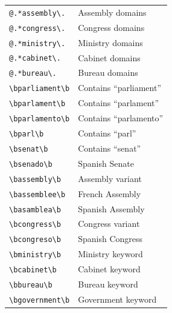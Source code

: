 \documentclass[12pt, letterpaper]{article}
\begin{document}
\begin{table}[ht]
\begin{tabular}{@{\hspace{0\tabcolsep}}ll@{\hspace{0\tabcolsep}}}
\verb|@.*assembly\.| & Assembly domains \\
\verb|@.*congress\.| & Congress domains \\
\verb|@.*ministry\.| & Ministry domains \\
\verb|@.*cabinet\.| & Cabinet domains \\
\verb|@.*bureau\.| & Bureau domains \\
\verb|\bparliament\b| & Contains ``parliament'' \\
\verb|\bparlament\b| & Contains ``parlament'' \\
\verb|\bparlamento\b| & Contains ``parlamento'' \\
\verb|\bparl\b| & Contains ``parl'' \\
\verb|\bsenat\b| & Contains ``senat'' \\
\verb|\bsenado\b| & Spanish Senate \\
\verb|\bassembly\b| & Assembly variant \\
\verb|\bassemblee\b| & French Assembly \\
\verb|\basamblea\b| & Spanish Assembly \\
\verb|\bcongress\b| & Congress variant \\
\verb|\bcongreso\b| & Spanish Congress \\
\verb|\bministry\b| & Ministry keyword \\
\verb|\bcabinet\b| & Cabinet keyword \\
\verb|\bbureau\b| & Bureau keyword \\
\verb|\bgovernment\b| & Government keyword \\
\bottomrule
\end{tabular}
\end{table}
\end{document}
